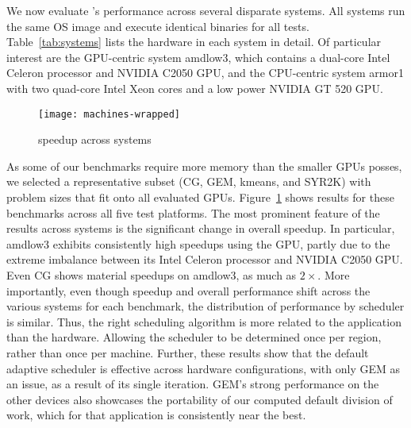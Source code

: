 We now evaluate \tsar's performance across several disparate systems. All
systems run the same OS image and execute identical binaries for all tests.
Table~\ref{tab:systems} lists the hardware in each system in detail. Of
particular interest are the GPU-centric system amdlow3, which contains a
dual-core Intel Celeron processor and NVIDIA C2050 GPU, and the CPU-centric
system armor1 with two quad-core Intel Xeon cores and a low power NVIDIA GT
520 GPU.

\begin{figure}[t]
        \texttt{[image: machines-wrapped]}
        \caption{\tsar speedup across systems}
	\label{fig:nodes}
\end{figure}

As some of our benchmarks require more memory than the smaller GPUs posses, we
selected a representative subset (CG, GEM, kmeans, and SYR2K) with problem
sizes that fit onto all evaluated GPUs.  Figure~\ref{fig:nodes} shows results
for these benchmarks across all five test platforms.  The most prominent
feature of the results across systems is the significant change in overall
speedup. In particular, amdlow3 exhibits consistently high speedups using the
GPU, partly due to the extreme imbalance between its Intel Celeron processor
and NVIDIA C2050 GPU. Even CG shows material speedups on amdlow3, as much as
$2 \times$. More importantly, even though speedup and overall performance
shift across the various systems for each benchmark, the distribution of
performance by scheduler is similar.  Thus, the right \tsar scheduling
algorithm is more related to the application than the hardware.  Allowing the
scheduler to be determined once per region, rather than once per machine.
Further, these results show that the default adaptive scheduler is effective
across hardware configurations, with only GEM as an issue, as a result of its
single iteration. GEM's strong performance on the other devices also showcases
the portability of our computed default division of work, which for that
application is consistently near the best.

